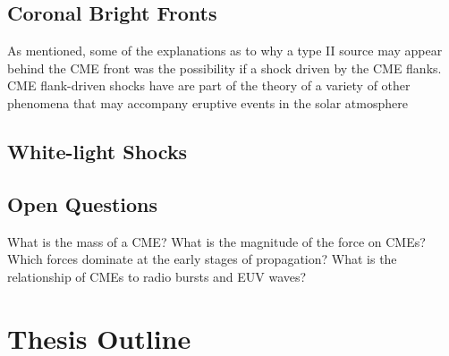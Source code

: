 \subsection{Coronal Bright Fronts}
As mentioned, some of the explanations as to why a type II source may appear behind the CME front was the possibility if a shock driven by the CME flanks. CME flank-driven shocks have are part of the theory of a variety of other phenomena that may accompany eruptive events in the solar atmosphere


\subsection{White-light Shocks}










\subsection{Open Questions}\label{sec:22}

What is the mass of a CME?
What is the magnitude of the force on CMEs?
Which forces dominate at the early stages of propagation?
What is the relationship of CMEs to radio bursts and EUV waves?

\section{Thesis Outline}





